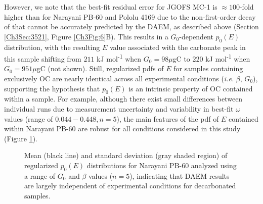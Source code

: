 However, we note that the best-fit residual error for JGOFS MC-1 is $\approx 100$-fold higher than for Narayani PB-60 and Pololu 4169 due to the non-first-order decay of  that cannot be accurately predicted by the DAEM, as described above (Section \ref{Ch3Sec:3521}, Figure \ref{Ch3Fig:6}B). This results in a $G_{0}$-dependent $p_{0}(E)$ distribution, with the resulting $E$ value associated with the carbonate peak in this sample shifting from $211$ kJ mol\textsuperscript{-1} when $G_{0}=98\mu$gC to $220$ kJ mol\textsuperscript{-1} when $G_{0}=951\mu$gC (not shown). Still, regularized pdfs of $E$ for samples containing exclusively OC are nearly identical across all experimental conditions (\textit{i.e.} $\beta$, $G_{0}$), supporting the hypothesis that $p_{0}(E)$ is an intrinsic property of OC contained within a sample. For example, although there exist small differences between individual runs due to measurement uncertainty and variability in best-fit $\omega$ values (range of $0.044 - 0.448, n=5$), the main features of the pdf of $E$ contained within Narayani PB-60 are robust for all conditions considered in this study (Figure \ref{Ch3Fig:7}). 

\begin{figure}[t]
	\caption[Average Narayani PB-60 $p_{0}(E)$ distribution for all experimental conditions]{Mean (black line) and standard deviation (gray shaded region) of regularized $p_{0}(E)$ distributions for Narayani PB-60 analyzed using a range of $G_{0}$ and $\beta$ values ($n = 5$), indicating that DAEM results are largely independent of experimental conditions for decarbonated samples.}
	\label{Ch3Fig:7} 
\end{figure}

